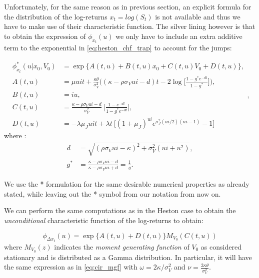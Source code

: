 Unfortunately, for the same reason as in previous section, an explicit formula for the distribution of the log-returns $x_t = log(S_t)$ is not available and thus we have to make use of their characteristic function.
The silver lining however is  that to obtain the expression of   $\phi_{x_t}(u)$ we only have to include an extra additive term to the exponential in \eqref{eq:heston_chf_trap} to account for the jumps:

\begin{subequations}
\begin{align}
\label{eq:bates_chf_trap}
\phi_{x_t}^*(u| x_0, V_0) &= \exp\{A(t,u) + B(t,u) x_0 + C(t,u) V_0 + D(t,u)\},\nonumber\\
A(t,u) &= \mu u i t +  \frac{\kappa\theta}{\sigma_V^2} \bigg( (\kappa - \rho\sigma_V u i - d)t - 2 \log\Big[  \frac{1-g^*e^{-dt}}{1-g^*} \Big] \bigg),\\
B(t,u) &= i u ,\\
C(t,u)&= \frac{\kappa - \rho\sigma_V u i - d}{\sigma_V^2} \:\Big[\frac{1-e^{-dt}}{1-g^*e^{-dt}}\Big],\\
D(t,u) &= -\lambda \mu_J u i t + \lambda t  \:\Big[ (1+\mu_J)^{ui} e^{\sigma_J^2(ui/2)(ui-1)}-1 \Big]
\end{align},
\end{subequations} 
where :
\begin{equation*}
\begin{split}
d&=\sqrt{(\rho \sigma_V u i - \kappa)^2 + \sigma_V^2(u i + u^2)},\\
g^*&= \frac{\kappa - \rho\sigma_V u i - d}{\kappa - \rho\sigma_V u i + d} = \frac{1}{g}.
\end{split}
\end{equation*} 

We use the  *  formulation for the same desirable numerical properties as already stated, while leaving out the * symbol from our notation from now on.

We can perform the same computations as in the Heston case to obtain the \textit{unconditional} characteristic function of the log-returns to obtain:

\begin{equation}
\label{eq:bates_uncond_chf}
\phi_{\Delta x_t}(u) =  \exp\{A(t,u) + D(t,u)\} M_{V_0}(C(t,u))
\end{equation}
where $M_{V_0}(z)$ indicates the \textit{moment generating function} of $V_0$ as considered stationary and is distributed as a Gamma distribution. In particular, it will have the same expression as in \eqref{eq:cir_mgf} with $\omega = {2\kappa} / {\sigma_V^2} $
and $\nu= \frac{2\kappa\theta}{\sigma_V^2}$.

